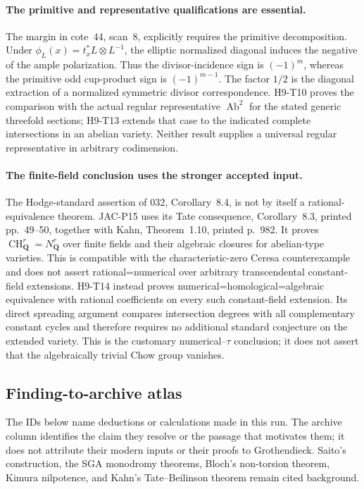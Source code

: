 \documentclass[11pt,a4paper]{article}
\begin{document}
\paragraph{The primitive and representative qualifications are essential.}
The margin in cote~44, scan~8, explicitly requires the primitive
decomposition. Under $\phi_L(x)=t_x^*L\otimes L^{-1}$, the
elliptic normalized diagonal induces the negative of the ample
polarization. Thus the divisor-incidence sign is $(-1)^m$,
whereas the primitive odd cup-product sign is $(-1)^{m-1}$.
The factor $1/2$ is the diagonal extraction of a normalized
symmetric divisor correspondence. H9-T10 proves the comparison
with the actual regular representative $\operatorname{Ab}^2$
for the stated generic threefold sections; H9-T13 extends that
case to the indicated complete intersections in an abelian variety.
Neither result supplies a universal regular representative in
arbitrary codimension.

\paragraph{The finite-field conclusion uses the stronger accepted input.}
The Hodge-standard assertion of 032, Corollary~8.4, is not by
itself a rational-equivalence theorem. JAC-P15 uses its Tate
consequence, Corollary~8.3, printed pp.~49--50, together with
Kahn, Theorem~1.10, printed p.~982. It proves
$\operatorname{CH}^r_{\mathbf Q}=N^r_{\mathbf Q}$ over finite
fields and their algebraic closures for abelian-type varieties.
This is compatible with the characteristic-zero Ceresa
counterexample and does not assert rational=numerical over
arbitrary transcendental constant-field extensions.
H9-T14 instead proves numerical=homological=algebraic equivalence
with rational coefficients on every such constant-field
extension. Its direct spreading argument compares intersection
degrees with all complementary constant cycles and therefore
requires no additional standard conjecture on the extended
variety. This is the customary numerical--$\tau$ conclusion;
it does not assert that the algebraically trivial Chow group vanishes.

\subsection*{Finding-to-archive atlas}

The IDs below name deductions or calculations made in this run.
The archive column identifies the claim they resolve or the
passage that motivates them; it does not attribute their modern
inputs or their proofs to Grothendieck. Saito's construction,
the SGA monodromy theorems, Bloch's non-torsion theorem, Kimura
nilpotence, and Kahn's Tate--Beilinson theorem remain cited
background.
\end{document}
